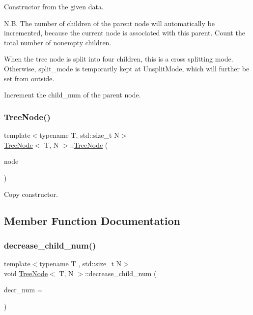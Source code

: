 Constructor from the given data.

N.\+B. The number of children of the parent node will automatically be incremented, because the current node is associated with this parent. Count the total number of nonempty children.

When the tree node is split into four children, this is a cross splitting mode. Otherwise, {\ttfamily split\+\_\+mode} is temporarily kept at {\ttfamily Unsplit\+Mode}, which will further be set from outside.

Increment the {\ttfamily child\+\_\+num} of the parent node.\mbox{\label{classTreeNode_af05018d87f64710f41df36bfedd562f3}} 
\subsubsection{\texorpdfstring{Tree\+Node()}{TreeNode()}\hspace{0.1cm}{\footnotesize\ttfamily [4/4]}}
{\footnotesize\ttfamily template$<$typename T, std\+::size\+\_\+t N$>$ \\
\hyperlink{classTreeNode}{Tree\+Node}$<$ T, N $>$\+::\hyperlink{classTreeNode}{Tree\+Node} (\begin{DoxyParamCaption}\item[{const \hyperlink{classTreeNode}{Tree\+Node}$<$ T, N $>$ \&}]{node }\end{DoxyParamCaption})}

Copy constructor. 

\subsection{Member Function Documentation}
\mbox{\label{classTreeNode_a25426ded0c574843912b36216b30dc5e}} 
\subsubsection{\texorpdfstring{decrease\+\_\+child\+\_\+num()}{decrease\_child\_num()}}
{\footnotesize\ttfamily template$<$typename T , std\+::size\+\_\+t N$>$ \\
void \hyperlink{classTreeNode}{Tree\+Node}$<$ T, N $>$\+::decrease\+\_\+child\+\_\+num (\begin{DoxyParamCaption}\item[{const unsigned int}]{decr\+\_\+num = {} }\end{DoxyParamCaption})}

